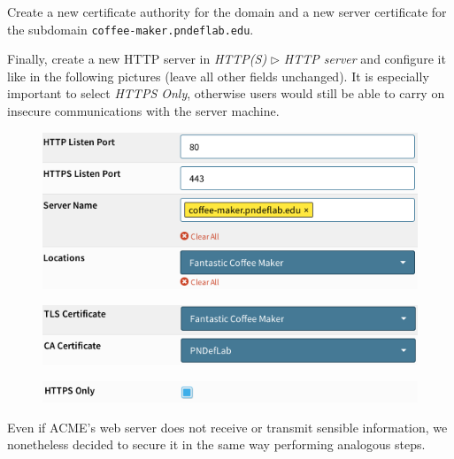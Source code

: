 \documentclass[draft]{homework}
\begin{document}
    Create a new certificate authority for the domain and a new server certificate for the subdomain \texttt{coffee-maker.pndeflab.edu}.
    
    Finally, create a new HTTP server in \textit{HTTP(S)} $\triangleright$ \textit{HTTP server} and configure it like in the following pictures (leave all other fields unchanged).
    It is especially important to select \textit{HTTPS Only}, otherwise users would still be able to carry on insecure communications with the server machine.
    \vspace{-5pt}
    \begin{figure}[H]
        \centering
        \includegraphics[width=1\linewidth]{images/http-server-1}
        \label{fig:http-server-1}
    \end{figure}
    \vspace{-20pt}
    \begin{figure}[H]
        \centering
        \includegraphics[width=1\linewidth]{images/http-server-2}
        \label{fig:http-server-2}
    \end{figure}
    \vspace{-20pt}
    \begin{figure}[H]
        \centering
        \includegraphics[width=1\linewidth]{images/http-server-3}
        \label{fig:http-server-3}
    \end{figure}
    \vspace{-20pt}
    
    Even if ACME's web server does not receive or transmit sensible information, we nonetheless decided to secure it in the same way performing analogous steps.
    
\end{document}
